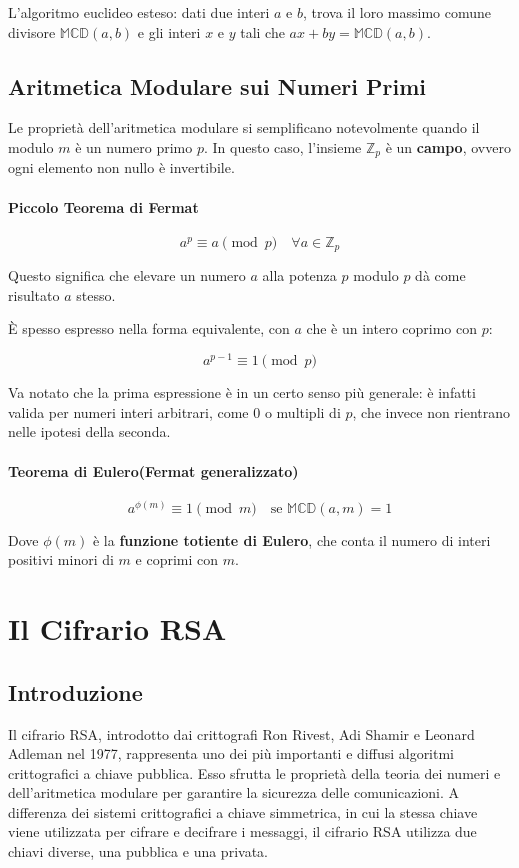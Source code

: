 \documentclass[a4paper,12pt]{report}
\begin{document}
L'algoritmo euclideo esteso: dati due interi $a$ e $b$, trova il loro massimo comune divisore $\mathbb{MCD}(a,b)$ e gli interi $x$ e $y$ tali che $ax + by = \mathbb{MCD}(a,b)$.

\section{Aritmetica Modulare sui Numeri Primi}

Le proprietà dell'aritmetica modulare si semplificano notevolmente quando il modulo $m$ è un numero primo $p$. In questo caso, l'insieme $\mathbb{Z}_p$ è un \textbf{campo}, ovvero ogni elemento non nullo è invertibile.

\subsubsection*{Piccolo Teorema di Fermat}

$$a^p \equiv a \pmod{p} \quad \forall a \in \mathbb{Z}_p$$

Questo significa che elevare un numero $a$ alla potenza $p$ modulo $p$ dà come risultato $a$ stesso.

È spesso espresso nella forma equivalente, con \(a\) che è un intero coprimo con \(p\):

\[a^{p-1} \equiv 1 \pmod{p}\]

Va notato che la prima espressione è in un certo senso più generale: è infatti valida per numeri interi arbitrari, come \(0\) o multipli di \(p\), che invece non rientrano nelle ipotesi della seconda.

\subsubsection*{Teorema di Eulero(Fermat generalizzato)}

$$a^{\phi(m)} \equiv 1 \pmod{m} \quad \text{se } \mathbb{MCD}(a,m) = 1$$

Dove $\phi(m)$ è la \textbf{funzione totiente di Eulero}, che conta il numero di interi positivi minori di $m$ e coprimi con $m$.
%
%
%
\chapter{Il Cifrario RSA}

\section{Introduzione}
Il cifrario RSA, introdotto dai crittografi Ron Rivest, Adi Shamir e Leonard Adleman nel 1977, rappresenta uno dei più importanti e diffusi algoritmi crittografici a chiave pubblica. 
Esso sfrutta le proprietà della teoria dei numeri e dell'aritmetica modulare per garantire la sicurezza delle comunicazioni. 
A differenza dei sistemi crittografici a chiave simmetrica, in cui la stessa chiave viene utilizzata per cifrare e decifrare i messaggi, il cifrario RSA utilizza due chiavi diverse, una pubblica e una privata.
\end{document}
